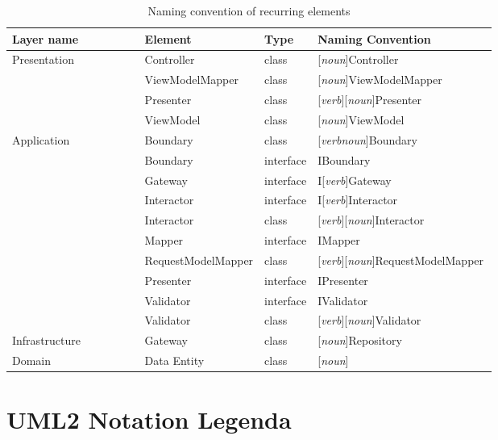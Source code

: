\begin{table}[H]
  \footnotesize
  \begin{tabular}{ l p{0.24\linewidth} p{0.09\linewidth} p{0.37\linewidth} }
  \hline
  \textbf{Layer name} & \textbf{Element} & \textbf{Type} & \textbf{Naming Convention} \\ \hline
  Presentation & Controller & class & [\textit{\gls{noun}}]Controller \\
  & ViewModelMapper & class & [\textit{\gls{noun}}]ViewModelMapper \\
  & Presenter & class & [\textit{\gls{verb}}][\textit{\gls{noun}}]Presenter \\
  & ViewModel & class & [\textit{\gls{noun}}]ViewModel \\

  Application & Boundary & class & [\textit{\gls{verb}\gls{noun}}]Boundary \\
  & Boundary  & interface & IBoundary \\
  & Gateway  & interface & I[\textit{\gls{verb}}]Gateway \\
  & Interactor  & interface & I[\textit{\gls{verb}}]Interactor \\
  & Interactor & class & [\textit{\gls{verb}}][\textit{\gls{noun}}]Interactor \\
  & Mapper  & interface & IMapper \\
  & RequestModelMapper & class & [\textit{\gls{verb}}][\textit{\gls{noun}}]RequestModelMapper \\
  & Presenter  & interface & IPresenter \\
  & Validator  & interface & IValidator \\
  & Validator & class & [\textit{\gls{verb}}][\textit{\gls{noun}}]Validator \\
  
  Infrastructure & Gateway & class & [\textit{\gls{noun}}]Repository \\

  Domain & Data Entity & class & [\textit{\gls{noun}}] \\ \hline

  \end{tabular}
  \caption{Naming convention of recurring elements}
  \label{table_element_naming_convention}
\end{table}

\section{UML2 Notation Legenda} \label{appendix_legenda} 

